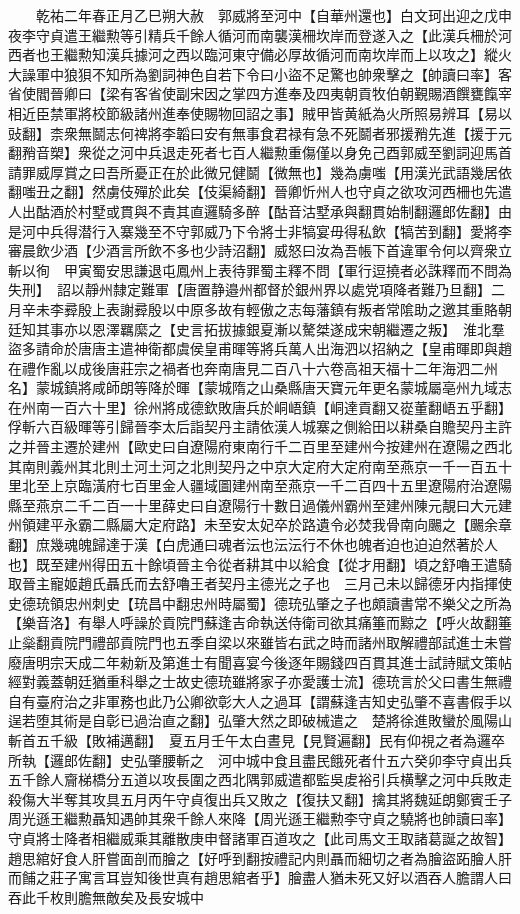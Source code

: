 　　乾祐二年春正月乙巳朔大赦　郭威將至河中【自華州還也】白文珂出迎之戊申夜李守貞遣王繼勲等引精兵千餘人循河而南襲漢柵坎岸而登遂入之【此漢兵柵於河西者也王繼勲知漢兵據河之西以臨河東守備必厚故循河而南坎岸而上以攻之】縱火大譟軍中狼狽不知所為劉詞神色自若下令曰小盜不足驚也帥衆擊之【帥讀曰率】客省使閻晉卿曰【梁有客省使副宋因之掌四方進奉及四夷朝貢牧伯朝覲賜酒饌甕餼宰相近臣禁軍將校節級諸州進奉使賜物回詔之事】賊甲皆黄紙為火所照易辨耳【易以䜴翻】柰衆無鬬志何禆將李韜曰安有無事食君禄有急不死鬬者邪援矟先進【援于元翻矟音槊】衆從之河中兵退走死者七百人繼勲重傷僅以身免己酉郭威至劉詞迎馬首請罪威厚賞之曰吾所憂正在於此微兄健鬬【微無也】幾為虜嗤【用漢光武語幾居依翻嗤丑之翻】然虜伎殫於此矣【伎渠綺翻】晉卿忻州人也守貞之欲攻河西柵也先遣人出酤酒於村墅或貫與不責其直邏騎多醉【酤音沽墅承與翻貫始制翻邏郎佐翻】由是河中兵得潜行入寨幾至不守郭威乃下令將士非犒宴毋得私飲【犒苦到翻】愛將李審晨飲少酒【少酒言所飲不多也少詩沼翻】威怒曰汝為吾帳下首違軍令何以齊衆立斬以徇　甲寅蜀安思謙退屯鳳州上表待罪蜀主釋不問【軍行逗撓者必誅釋而不問為失刑】　詔以靜州隸定難軍【唐置静邉州都督於銀州界以處党項降者難乃旦翻】二月辛未李彛殷上表謝彛殷以中原多故有輕傲之志每藩鎮有叛者常隂助之邀其重賂朝廷知其事亦以恩澤羈縻之【史言拓拔據銀夏漸以驁桀遂成宋朝繼遷之叛】　淮北羣盜多請命於唐唐主遣神衛都虞侯皇甫暉等將兵萬人出海泗以招納之【皇甫暉即與趙在禮作亂以成後唐莊宗之禍者也奔南唐見二百八十六卷高祖天福十二年海泗二州名】蒙城鎮將咸師朗等降於暉【蒙城隋之山桑縣唐天寶元年更名蒙城屬亳州九域志在州南一百六十里】徐州將成德欽敗唐兵於峒峿鎮【峒達貢翻又嵸董翻峿五乎翻】俘斬六百級暉等引歸晉李太后詣契丹主請依漢人城寨之側給田以耕桑自贍契丹主許之并晉主遷於建州【歐史曰自遼陽府東南行千二百里至建州今按建州在遼陽之西北其南則義州其北則土河土河之北則契丹之中京大定府大定府南至燕京一千一百五十里北至上京臨潢府七百里金人疆域圖建州南至燕京一千二百四十五里遼陽府治遼陽縣至燕京二千二百一十里薛史曰自遼陽行十數日過儀州霸州至建州陳元靚曰大元建州領建平永霸二縣屬大定府路】未至安太妃卒於路遺令必焚我骨南向颺之【颺余章翻】庶幾魂魄歸達于漢【白虎通曰魂者沄也沄沄行不休也魄者迫也迫迫然著於人也】既至建州得田五十餘頃晉主令從者耕其中以給食【從才用翻】頃之舒嚕王遣騎取晉主寵姬趙氏聶氏而去舒嚕王者契丹主德光之子也　三月己未以歸德牙内指揮使史德珫領忠州刺史【珫昌中翻忠州時屬蜀】德珫弘肇之子也頗讀書常不樂父之所為【樂音洛】有舉人呼譟於貢院門蘇逢吉命執送侍衛司欲其痛箠而黥之【呼火故翻箠止橤翻貢院門禮部貢院門也五季自梁以來雖皆右武之時而諸州取解禮部試進士未嘗廢唐明宗天成二年勑新及第進士有聞喜宴今後逐年賜錢四百貫其進士試詩賦文策帖經對義蓋朝廷猶重科舉之士故史德珫雖將家子亦愛護士流】德珫言於父曰書生無禮自有臺府治之非軍務也此乃公卿欲彰大人之過耳【謂蘇逢吉知史弘肇不喜書假手以逞若堕其術是自彰已過治直之翻】弘肇大然之即破械遣之　楚將徐進敗蠻於風陽山斬首五千級【敗補邁翻】　夏五月壬午太白晝見【見賢遍翻】民有仰視之者為邏卒所執【邏郎佐翻】史弘肇腰斬之　河中城中食且盡民餓死者什五六癸卯李守貞出兵五千餘人齎梯橋分五道以攻長圍之西北隅郭威遣都監吳䖍裕引兵横擊之河中兵敗走殺傷大半奪其攻具五月丙午守貞復出兵又敗之【復扶又翻】擒其將魏延朗鄭賓壬子周光遜王繼勲聶知遇帥其衆千餘人來降【周光遜王繼勲李守貞之驍將也帥讀曰率】守貞將士降者相繼威乘其離散庚申督諸軍百道攻之【此司馬文王取諸葛誕之故智】趙思綰好食人肝嘗面剖而膾之【好呼到翻按禮記内則聶而細切之者為膾盜跖膾人肝而餔之莊子寓言耳豈知後世真有趙思綰者乎】膾盡人猶未死又好以酒吞人膽謂人曰吞此千枚則膽無敵矣及長安城中